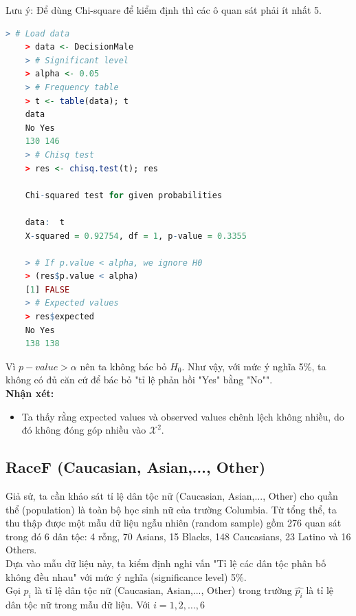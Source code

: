 \documentclass[a4paper,12pt]{article}
\begin{document}
	Lưu ý: Để dùng Chi-square để kiểm định thì các ô quan sát phải ít nhất 5.
	
	\begin{lstlisting}[language=R]
	> # Load data
	> data <- DecisionMale
	> # Significant level
	> alpha <- 0.05
	> # Frequency table
	> t <- table(data); t
	data
	No Yes 
	130 146 
	> # Chisq test
	> res <- chisq.test(t); res
	
	Chi-squared test for given probabilities
	
	data:  t
	X-squared = 0.92754, df = 1, p-value = 0.3355
	
	> # If p.value < alpha, we ignore H0
	> (res$p.value < alpha)
	[1] FALSE
	> # Expected values
	> res$expected
	No Yes 
	138 138
	\end{lstlisting}
	
	Vì $p-value > \alpha$ nên ta không bác bỏ $H_0$. Như vậy, với mức ý nghĩa 5\%, ta không có đủ căn cứ để bác bỏ "tỉ lệ phản hồi "Yes" bằng "No"".\\
	
	\textbf{Nhận xét:}\\
	\begin{itemize}
		\item Ta thấy rằng expected values và observed values chênh lệch không nhiều, do đó không đóng góp nhiều vào $\mathcal{X}^2$.
	\end{itemize}
	
	
	
	\subsection{RaceF (Caucasian, Asian,..., Other)}
	
	Giả sử, ta cần khảo sát tỉ lệ dân tộc nữ (Caucasian, Asian,..., Other) cho quần thể (population) là toàn bộ học sinh nữ của trường Columbia. Từ tổng thể, ta thu thập được một mẫu dữ liệu ngẫu nhiên (random sample) gồm 276 quan sát trong đó 6 dân tộc: 4 rỗng, 70 Asians, 15 Blacks, 148 Caucasians, 23 Latino và 16 Others.\\
	
	Dựa vào mẫu dữ liệu này, ta kiểm định nghi vấn "Tỉ lệ các dân tộc phân bố không đều nhau" với mức ý nghĩa (significance level) 5\%.\\
	
	Gọi $p_i$ là tỉ lệ dân tộc nữ (Caucasian, Asian,..., Other) trong trường $\hat{p_i}$ là tỉ lệ dân tộc nữ trong mẫu dữ liệu. Với $i = 1, 2, \dots, 6$\\
	
\end{document}
